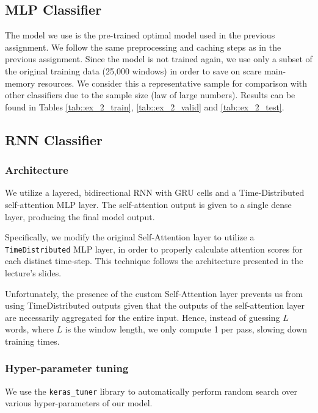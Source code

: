 \documentclass[10pt, a4paper]{article}
\begin{document}
	
	\subsection{MLP Classifier}
	
	The model we use is the pre-trained optimal model used in the previous assignment. We follow the same preprocessing and caching steps as in the previous assignment. Since the model is not trained again, we use only a subset of the original training data (25,000 windows) in order to save on scare main-memory resources. We consider this a representative sample for comparison with other classifiers due to the sample size (law of large numbers). Results can be found in Tables \ref{tab::ex_2_train}, \ref{tab::ex_2_valid} and \ref{tab::ex_2_test}.
	
	
	\subsection{RNN Classifier}
	
	\subsubsection{Architecture}
	
	We utilize a layered, bidirectional RNN with GRU cells and a Time-Distributed self-attention MLP layer. The self-attention output is given to a single dense layer, producing the final model output.
	
	Specifically, we modify the original Self-Attention layer to utilize a \texttt{TimeDistributed} MLP layer, in order to properly calculate attention scores for each distinct time-step. This technique follows the architecture presented in the lecture's slides.
	
	Unfortunately, the presence of the custom Self-Attention layer prevents us from using TimeDistributed outputs given that the outputs of the self-attention layer are necessarily aggregated for the entire input. Hence, instead of guessing $L$ words, where $L$ is the window length, we only compute 1 per pass, slowing down training times.
	
	\subsubsection{Hyper-parameter tuning}
	
	We use the \texttt{keras\_tuner} library to automatically perform random search over various hyper-parameters of our model.
	
\end{document}
